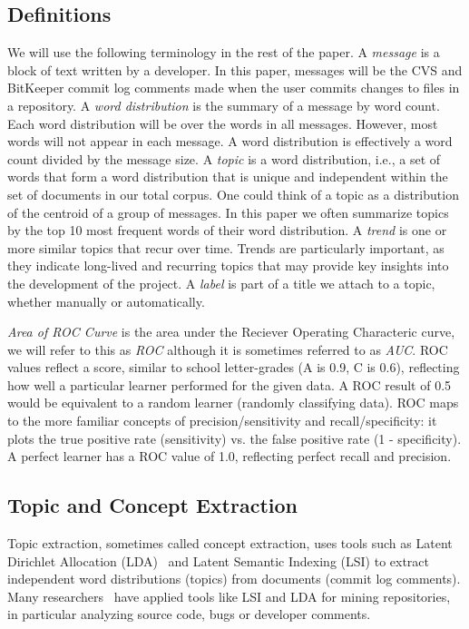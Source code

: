 \documentclass{acm_proc_article-sp}
\begin{document}
\subsection{Definitions}
We will use the following terminology in the rest of the paper.
A \emph{message} is a block of text written by a developer. In this
paper, messages will be the CVS and BitKeeper commit log comments made
when the user commits changes to files in a repository. A \emph{word
  distribution} is the summary of a message by word count. Each word
distribution will be over the words in all messages. However, most
words will not appear in each message. A word distribution is effectively
a word count divided by the message size. A \emph{topic} is a word
distribution, i.e., a set of words that form a word distribution that is
unique and independent within the set of documents in our total
corpus. One could think of a topic as a distribution of the centroid
of a group of messages. In this paper we often summarize topics by the
top 10 most frequent words of their word distribution.  A \emph{trend}
is one or more similar topics that recur over time.  Trends are
particularly important, as they indicate long-lived and recurring
topics that may provide key insights into the development of the
project. A \emph{label} is part of a title we attach to a topic, whether manually or automatically.

\emph{Area of ROC Curve} is the area under the Reciever Operating Characteric curve, we will refer to this as \emph{ROC} although it is sometimes referred to as \emph{AUC}. ROC values reflect a score, similar to school letter-grades (A is 0.9, C is 0.6), reflecting how well a particular learner performed for the given data. A ROC result of 0.5 would be equivalent to a random learner (randomly classifying data). ROC maps to the more familiar concepts of precision/sensitivity and recall/specificity: it plots the true positive rate (sensitivity) vs. the false positive rate (1 - specificity). A perfect learner has a ROC value of 1.0, reflecting perfect recall and precision.

\subsection{Topic and Concept Extraction}
Topic extraction, sometimes called concept extraction, uses tools such as Latent Dirichlet Allocation (LDA)~\cite{Blei2003} and Latent Semantic Indexing (LSI) to extract
independent word distributions (topics) from
	documents (commit log comments). Many researchers~\cite{marcus04wcre,Poshyvanyk2007,lukins08wcre,Linstead2007} have applied tools like LSI and LDA for mining repositories, in particular analyzing source code, bugs or developer comments.

\end{document}
